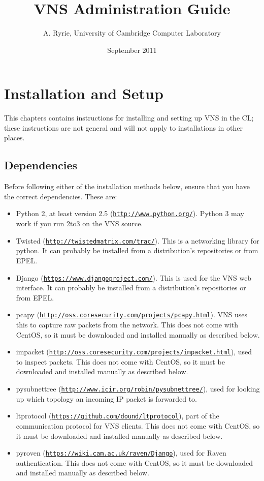 \documentclass[a4paper,12pt]{report}
\begin{document}
\title{VNS Administration Guide}
\author{A. Ryrie, University of Cambridge Computer Laboratory}
\date{September 2011}

\maketitle

\tableofcontents

\chapter{Installation and Setup}
This chapters contains instructions for installing and setting up VNS in the CL; these instructions are not general and will not apply to installations in other places.

\section{Dependencies}
Before following either of the installation methods below, ensure that you have the correct dependencies.  These are:

\begin{itemize}
\item Python 2, at least version 2.5 (\texttt{\url{http://www.python.org/}}).  Python 3 may work if you run 2to3 on the VNS source.
\item Twisted (\texttt{\url{http://twistedmatrix.com/trac/}}).  This is a networking library for python.  It can probably be installed from a distribution's repositories or from EPEL.
\item Django (\texttt{\url{https://www.djangoproject.com/}}).  This is used for the VNS web interface.  It can probably be installed from a distribution's repositories or from EPEL.
\item pcapy (\texttt{\url{http://oss.coresecurity.com/projects/pcapy.html}}).  VNS uses this to capture raw packets from the network.  This does not come with CentOS, so it must be downloaded and installed manually as described below.
\item impacket (\texttt{\url{http://oss.coresecurity.com/projects/impacket.html}}), used to inspect packets.  This does not come with CentOS, so it must be downloaded and installed manually as described below.
\item pysubnettree (\texttt{\url{http://www.icir.org/robin/pysubnettree/}}), used for looking up which topology an incoming IP packet is forwarded to.
\item ltprotocol (\texttt{\url{https://github.com/dound/ltprotocol}}), part of the communication protocol for VNS clients.  This does not come with CentOS, so it must be downloaded and installed manually as described below.
\item pyroven (\texttt{\url{https://wiki.cam.ac.uk/raven/Django}}), used for Raven authentication.  This does not come with CentOS, so it must be downloaded and installed manually as described below.
\end{itemize}
\end{document}
